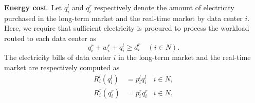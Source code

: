 
\textbf{Energy cost}. Let $q^l_i$ and ${q}_i^r$ respectively denote the amount of electricity purchased in the long-term market and the real-time market by data center $i.$ Here, we require that sufficient electricity is procured to process the workload routed to each data center as
$$q^r_i + w^r_i + q^l_i \geq d^r_i \quad (i \in N).$$
The electricity bills of data center $i$ in the long-term market and the real-time market are respectively computed as
\begin{align*}
R^l_i(q^l_i) &= p^l_i q^l_i & i\in N, \\
R^r_i(q^r_i) &= {p}_i^r q^r_i & i \in N.
\end{align*}





